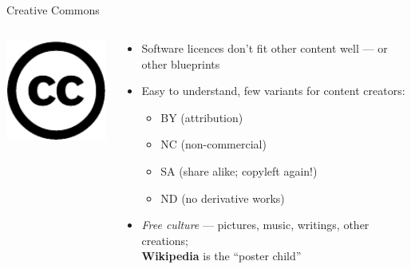 \documentclass{beamer}
\begin{document}
\subsection{}
\begin{frame}{Creative Commons}
\begin{columns}
\begin{column}{4cm}
\includegraphics[width=4cm]{cc.pdf}
\end{column}
\begin{column}{7cm}
\begin{itemize}
\item Software licences don't fit other content well --- or other blueprints
\item Easy to understand, few variants for content creators:
\begin{itemize}
\item BY (attribution)
\item NC (non-commercial)
\item SA (share alike; copyleft again!)
\item ND (no derivative works)
\end{itemize}
\item {\em Free culture} --- pictures, music, writings, other creations;\\{\bf Wikipedia} is the ``poster child''
\end{itemize}
\end{column}
\end{columns}
\end{frame}
\end{document}
